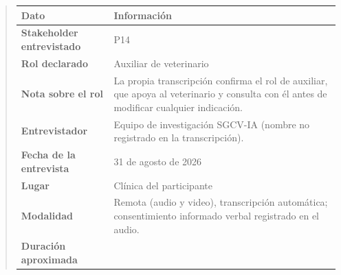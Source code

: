 \documentclass[
]{article}
\newcounter{none} %
\begin{document}
\begin{quote}
{\def\LTcaptype{none} %
\begin{longtable}[]{|
  >{\raggedright\arraybackslash}p{}|
  >{\raggedright\arraybackslash}p{}|}
\hline
\begin{minipage}[b]{\linewidth}\centering
\textbf{Dato}
\end{minipage} & \begin{minipage}[b]{\linewidth}\centering
\textbf{Información}
\end{minipage} \\
\hline
\endhead
\hline
\endlastfoot
\textbf{Stakeholder entrevistado} & \begin{minipage}[t]{\linewidth}\raggedright
P14
\end{minipage} \\
\hline
\textbf{Rol declarado} & \begin{minipage}[t]{\linewidth}\raggedright
Auxiliar de veterinario
\end{minipage} \\
\hline
\textbf{Nota sobre el rol} & \begin{minipage}[t]{\linewidth}\raggedright
La propia transcripción confirma el rol de auxiliar, que apoya al veterinario y consulta con él antes de modificar cualquier indicación.
\end{minipage} \\
\hline
\textbf{Entrevistador} & \begin{minipage}[t]{\linewidth}\raggedright
Equipo de investigación SGCV-IA (nombre no registrado en la transcripción).
\end{minipage} \\
\hline
\textbf{Fecha de la entrevista} & \begin{minipage}[t]{\linewidth}\raggedright
31 de agosto de 2026
\end{minipage} \\
\hline
\textbf{Lugar} & \begin{minipage}[t]{\linewidth}\raggedright
Clínica del participante
\end{minipage} \\
\hline
\textbf{Modalidad} & \begin{minipage}[t]{\linewidth}\raggedright
Remota (audio y video), transcripción automática; consentimiento informado verbal registrado en el audio.
\end{minipage} \\
\hline
\textbf{Duración aproximada} & \begin{minipage}[t]{\linewidth}\raggedright

\end{minipage}
\end{longtable}}
\end{quote}
\end{document}
